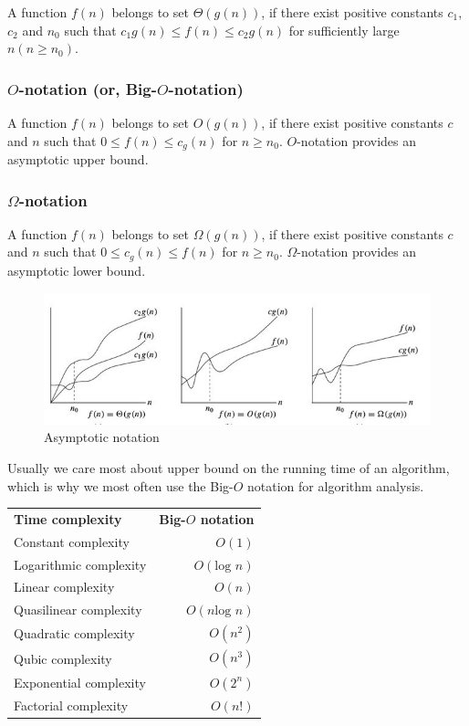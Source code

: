 \documentclass[a4paper,11pt]{book}
\begin{document}
A function $f(n)$ belongs to set $\Theta\left(g(n)\right)$, if there exist positive constants $c_1$, $c_2$ and $n_0$ such that $c_1g(n) \leq f(n) \leq c_2g(n)$ for sufficiently large $n (n \geq n_0)$.

\subsubsection{$O$-notation (or, Big-$O$-notation)}
A function $f(n)$ belongs to set $O\left(g(n)\right)$, if there exist positive constants $c$ and $n$ such that $0 \leq f(n) \leq c_g(n)$ for $n \geq n_0$. $O$-notation provides an asymptotic upper bound.

\subsubsection{$\Omega$-notation}
A function $f(n)$ belongs to set $\Omega\left(g(n)\right)$, if there exist positive constants $c$ and $n$ such that $0 \leq c_g(n) \leq f(n)$ for $n \geq n_0$. $\Omega$-notation provides an asymptotic lower bound.

\begin{figure}[ht]
	\centering
	\includegraphics[scale=0.5]{pic/time.jpg}
	\caption{Asymptotic notation}
\end{figure}

\noindent Usually we care most about upper bound on the running time of an algorithm, which is why we most often use the Big-$O$ notation for algorithm analysis.

\begin{table}[ht]
\centering
\begin{tabular}{lr}
\textbf{Time complexity}        & \textbf{Big-$O$ notation}    \\
Constant complexity    & $O(1)$              \\
Logarithmic complexity & $O(\text{log } n)$   \\
Linear complexity      & $O(n)$              \\
Quasilinear complexity & $O(n \text{log } n)$ \\
Quadratic complexity   & $O(n^2)$            \\
Qubic complexity       & $O(n^3)$            \\
Exponential complexity & $O(2^n)$            \\
Factorial complexity   & $O(n!)$            
\end{tabular}
\end{table}
\end{document}
